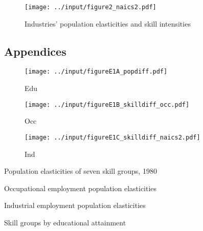 \documentclass[11pt]{article}
\begin{document}
\begin{figure} \caption{Industries' population elasticities and skill intensities} \begin{center}
\texttt{[image: ../input/figure2\_naics2.pdf]}
\label{fig:ind_popelast}
\end{center}\end{figure}



\pagebreak

\subsection{Appendices}

\begin{figure} \caption{Edu} \begin{center}
\texttt{[image: ../input/figureE1A\_popdiff.pdf]}
\label{fig:edu}
\end{center}\end{figure}

\begin{figure} \caption{Occ} \begin{center}
\texttt{[image: ../input/figureE1B\_skilldiff\_occ.pdf]}
\label{fig:occ}
\end{center}\end{figure}

\begin{figure} \caption{Ind} \begin{center}
\texttt{[image: ../input/figureE1C\_skilldiff\_naics2.pdf]}
\label{fig:naics}
\end{center}\end{figure}


\begin{table} \caption{Population elasticities of seven skill groups, 1980}

\label{tab:E1}
\end{table}

\begin{table} \caption{Occupational employment population elasticities}
\resizebox{\textwidth}{!}{

}
\label{tab:E2}
\end{table}

\begin{table} \caption{Industrial employment population elasticities}
\resizebox{\textwidth}{!}{

}
\label{tab:E3}
\end{table}

\begin{table} \caption{Skill groups by educational attainment}
\resizebox{\textwidth}{!}{}
\label{tab:E4}
\end{table}
\end{document}
